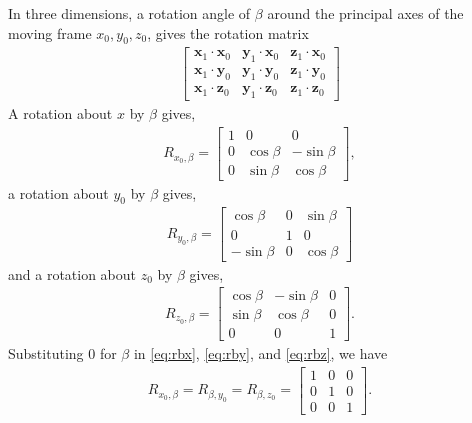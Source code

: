 \begin{solution}
	In three dimensions, a rotation angle of $\beta$ around the principal axes of the moving frame  $x_0, y_0, z_0$, gives the rotation matrix
	\begin{align}
	\begin{bmatrix}
	\bm{x}_1 \cdot \bm{x}_0 & \bm{y}_1 \cdot \bm{x}_0   &   \bm{z}_1 \cdot \bm{x}_0  \\
	\bm{x}_1 \cdot \bm{y}_0    & \bm{y}_1 \cdot \bm{y}_0   &  \bm{z}_1  \cdot  \bm{y}_0 \\
	 \bm{x}_1\cdot  \bm{z}_0   &   \bm{y}_1 \cdot \bm{z}_0  &  \bm{z}_1 \cdot \bm{z}_0
	\end{bmatrix} 
	\end{align}
	A rotation about $x$ by $\beta$ gives,
	\begin{align}
	R_{x_0, \beta} = \begin{bmatrix}
	1 & 0   &  0  \\
	0   & \cos \beta   &  -\sin \beta  \\
	0  &  \sin \beta  &  \cos \beta 
	\end{bmatrix},
	\label{eq:rbx}
	\end{align}
	a rotation about $y_0$ by $\beta$ gives,
	\begin{align}
	R_{y_0, \beta} = \begin{bmatrix}
	\cos \beta & 0   &  \sin \beta   \\
	0   &  1   &  0 \\
	-\sin \beta  &  0  &  \cos \beta 
	\end{bmatrix}
	\label{eq:rby}
	\end{align}
	and a rotation about $z_0$ by $\beta$ gives,
	\begin{align}
	R_{z_0, \beta} = \begin{bmatrix}
	\cos \beta & -\sin \beta    &  0  \\
	\sin \beta    &  \cos \beta   &  0 \\
	0 &  0  &  1 
	\end{bmatrix}.
	\label{eq:rbz}
	\end{align}
	Substituting $0$ for $\beta$ in \eqref{eq:rbx}, \eqref{eq:rby}, and \eqref{eq:rbz}, we have
	\begin{align}
		R_{x_0, \beta} = R_{\beta, y_0} = R_{\beta, z_0} = \begin{bmatrix}
		1 & 0   &  0  \\
		0    &  1   &  0 \\
		0 &  0  &  1 
		\end{bmatrix}.
	\end{align}
	

\end{solution}

